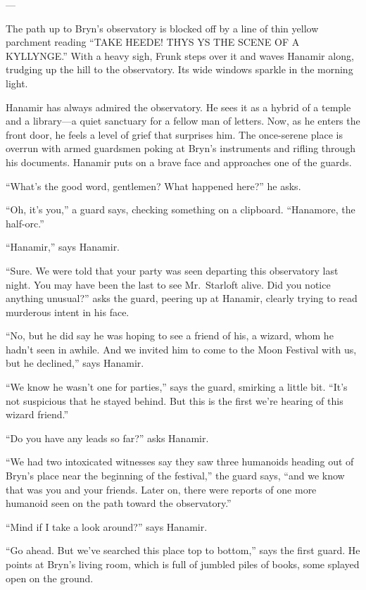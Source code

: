 \documentclass[smalldemyvopaper,11pt,twoside,onecolumn,openright,extrafontsizes]{memoir}
\begin{document}
---

The path up to Bryn's observatory is blocked off by a line of thin
yellow parchment reading ``TAKE HEEDE! THYS YS THE SCENE OF A
KYLLYNGE.'' With a heavy sigh, Frunk steps over it and waves Hanamir
along, trudging up the hill to the observatory. Its wide windows sparkle
in the morning light.

Hanamir has always admired the observatory. He sees it as a hybrid of a
temple and a library---a quiet sanctuary for a fellow man of letters.
Now, as he enters the front door, he feels a level of grief that
surprises him. The once-serene place is overrun with armed guardsmen
poking at Bryn's instruments and rifling through his documents. Hanamir
puts on a brave face and approaches one of the guards.

``What's the good word, gentlemen? What happened here?'' he asks.

``Oh, it's you,'' a guard says, checking something on a clipboard.
``Hanamore, the half-orc.''

``Hanamir,'' says Hanamir.

``Sure. We were told that your party was seen departing this observatory
last night. You may have been the last to see Mr.~Starloft alive. Did
you notice anything unusual?'' asks the guard, peering up at Hanamir,
clearly trying to read murderous intent in his face.

``No, but he did say he was hoping to see a friend of his, a wizard,
whom he hadn't seen in awhile. And we invited him to come to the Moon
Festival with us, but he declined,'' says Hanamir.

``We know he wasn't one for parties,'' says the guard, smirking a little
bit. ``It's not suspicious that he stayed behind. But this is the first
we're hearing of this wizard friend.''

``Do you have any leads so far?'' asks Hanamir.

``We had two intoxicated witnesses say they saw three humanoids heading
out of Bryn's place near the beginning of the festival,'' the guard
says, ``and we know that was you and your friends. Later on, there were
reports of one more humanoid seen on the path toward the observatory.''

``Mind if I take a look around?'' says Hanamir.

``Go ahead. But we've searched this place top to bottom,'' says the
first guard. He points at Bryn's living room, which is full of jumbled
piles of books, some splayed open on the ground.
\end{document}
